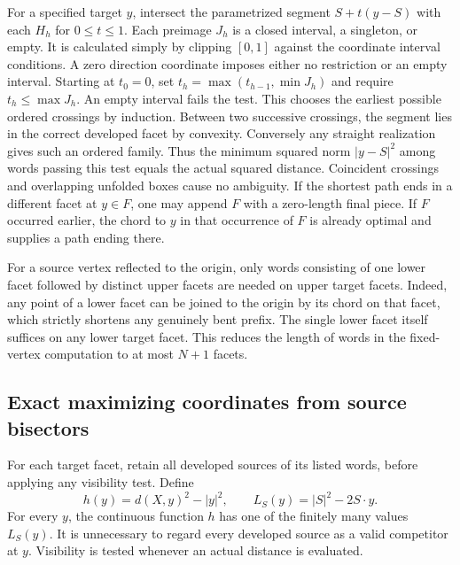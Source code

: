 \documentclass[10pt,letterpaper]{article}
\begin{document}
For a specified target $y$, intersect the parametrized segment
$S+t(y-S)$ with each $H_h$ for $0\le t\le1$. Each preimage $J_h$ is a
closed interval, a singleton, or empty. It is calculated simply by clipping
$[0,1]$ against the coordinate interval conditions. A zero direction
coordinate imposes either no restriction or an empty interval. Starting
at $t_0=0$, set $t_h=\max(t_{h-1},\min J_h)$ and require
$t_h\le\max J_h$. An empty interval fails the test. This chooses the earliest
possible ordered crossings by induction. Between two successive crossings,
the segment lies in the correct developed facet by convexity. Conversely
any straight realization gives such an ordered family. Thus the minimum
squared norm $|y-S|^2$ among words passing this test equals the actual
squared distance. Coincident crossings and overlapping unfolded boxes cause
no ambiguity. If the shortest path ends in a different facet at $y\in F$,
one may append $F$ with a zero-length final piece. If $F$ occurred earlier,
the chord to $y$ in that occurrence of $F$ is already optimal and supplies
a path ending there.

For a source vertex reflected to the origin, only words consisting of one
lower facet followed by distinct upper facets are needed on upper target
facets. Indeed, any point of a lower facet can be joined to the origin by
its chord on that facet, which strictly shortens any genuinely bent prefix.
The single lower facet itself suffices on any lower target facet. This
reduces the length of words in the fixed-vertex computation to at most
$N+1$ facets.

\subsection{Exact maximizing coordinates from source bisectors}
For each target facet, retain all developed sources of its listed words,
before applying any visibility test. Define
\[
 h(y)=d(X,y)^2-|y|^2,\qquad
 L_S(y)=|S|^2-2S\mathbin{\cdot}y.
\]
For every $y$, the continuous function $h$ has one of the finitely many
values $L_S(y)$. It is unnecessary to regard every developed source as a
valid competitor at $y$. Visibility is tested whenever an actual distance
is evaluated.
\end{document}
